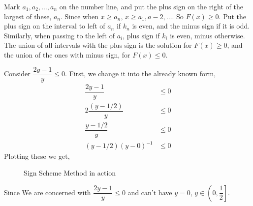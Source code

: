 \begin{enumerate}
    \ii Mark \(a_1,a_2,\dots,a_n\) on the number line, and put the plus sign on the right of the
    largest of these, \(a_n\). Since when \(x \ge a_n\), \(x \ge a_1, a-2, \dots\). So \(F(x) \ge 0\).
    \ii Put the plus sign on the interval to left of \(a_n\) if \(k_n\) is even, and the minus 
    sign if it is odd. Similarly, when passing to the left of \(a_i\), plus sign if \(k_i\)
    is even, minus otherwise.
    \ii The union of all intervals with the plus sign is the solution for \(F(x) \ge 0\), and
    the union of the ones with minus sign, for \(F(x) \le 0\). 
\end{enumerate}

\begin{example}
    Consider \(\dfrac{2y-1}{y} \le 0\). First, we change it into the already known form,
    \begin{align}
        \dfrac{2y-1}{y} &\le 0\\
        2\dfrac{(y-1/2)}{y} &\le 0\\
        \dfrac{y-1/2}{y} &\le 0\\
        (y-1/2)(y-0)^{-1} &\le 0
    \end{align}
    Plotting these we get,
    \begin{figure}[H]
        \centering
        \caption{Sign Scheme Method in action}
    \end{figure}

    Since We are concerned with \(\dfrac{2y-1}{y} \le 0\) and can't have \(y=0\),
    \(y \in \left(0,\dfrac{1}{2}\right]\).
\end{example}